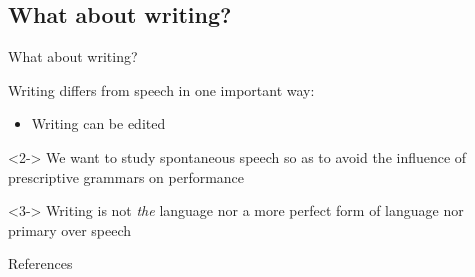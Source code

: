 \documentclass{beamer}
\newcommand{\subtwoseven}{What about writing?}
\begin{document}
    \subsection{\subtwoseven}
      \begin{frame}{\subtwoseven}
        \begin{block}{}
          Writing differs from speech in one important way:
          \begin{itemize}
            \item Writing can be edited
          \end{itemize}
        \end{block}
        \begin{block}<2->{}
          We want to study spontaneous speech so as to avoid the influence of prescriptive grammars on performance
        \end{block}
        \begin{alertblock}<3->{}
          Writing is not \emph{the} language nor a more perfect form of language nor primary over speech
        \end{alertblock}
      \end{frame}

  \begin{frame}[allowframebreaks]{References}
    \printbibliography
  \end{frame}
\end{document}
